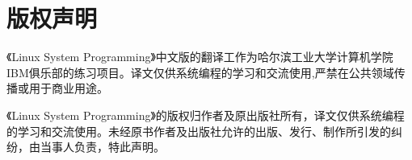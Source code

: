 \chapter{版权声明}
《Linux System Programming》中文版的翻译工作为哈尔滨工业大学计算机学院IBM俱乐部的练习项目。译文仅供系统编程的学习和交流使用,严禁在公共领域传播或用于商业用途。

《Linux System Programming》的版权归作者及原出版社所有，译文仅供系统编程的学习和交流使用。未经原书作者及出版社允许的出版、发行、制作所引发的纠纷，由当事人负责，特此声明。
